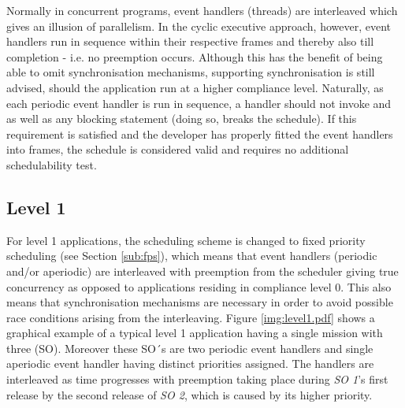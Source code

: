 
Normally in concurrent programs, event handlers (threads) are interleaved which gives an illusion of parallelism. In the cyclic executive approach, however, event handlers run in sequence within their respective frames and thereby also till completion - i.e. no preemption occurs. Although this has the benefit of being able to omit synchronisation mechanisms, supporting synchronisation is still advised, should the application run at a higher compliance level. Naturally, as each periodic event handler is run in sequence, a handler should not invoke  and  as well as any blocking statement (doing so, breaks the schedule). If this requirement is satisfied and the developer has properly fitted the event handlers into frames, the schedule is considered valid and requires no additional schedulability test.

\subsection{Level 1}
For level 1 applications, the scheduling scheme is changed to fixed priority scheduling (see Section \ref{sub:fps}), which means that event handlers (periodic and/or aperiodic) are interleaved with preemption from the scheduler giving true concurrency as opposed to applications residing in compliance level 0. This also means that synchronisation mechanisms are necessary in order to avoid possible race conditions arising from the interleaving. Figure \ref{img:level1.pdf} shows a graphical example of a typical level 1 application having a single mission with three  (SO). Moreover these SO´s are two periodic event handlers and single aperiodic event handler having distinct priorities assigned. The handlers are interleaved as time progresses with preemption taking place during \textit{SO 1}'s first release by the second release of \textit{SO 2}, which is caused by its higher priority.


